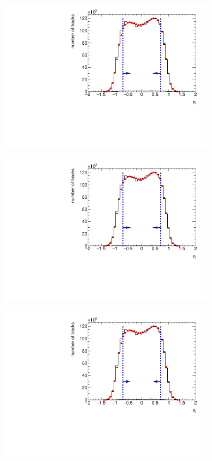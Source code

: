 \begin{figure}[h!]
	\centering
	\begin{subfigure}{.45\textwidth}
		\includegraphics[width=\textwidth, page=2]{chapters/chrgSTAR/img/selection/SDT.pdf}
		\caption{}
	\end{subfigure}
	\begin{subfigure}{.45\textwidth}
		\includegraphics[width=\textwidth, page=1]{chapters/chrgSTAR/img/selection/SDT.pdf}
		\caption{}
	\end{subfigure}
	\begin{subfigure}{.45\textwidth}
		\includegraphics[width=\textwidth, page=9]{chapters/chrgSTAR/img/selection/SDT.pdf}

\end{subfigure}
\end{figure}
